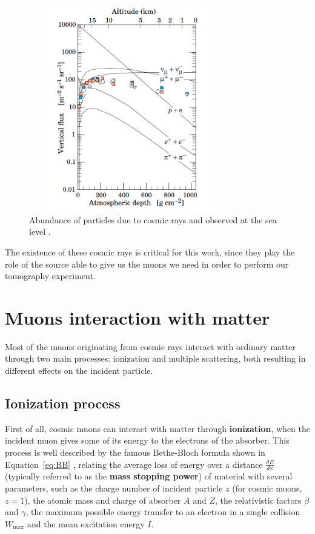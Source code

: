 \documentclass[a4paper, 11pt]{report}
\begin{document}
\begin{figure}[htbp]
\begin{center}
\includegraphics[width=8.5cm, height=9cm]{figs/cosmicMuons.png}
\caption{Abundance of particles due to cosmic rays and observed at the sea level \cite{cosmicPDG}.}
\label{figure:cosmicAbundance}
\end{center}
\end{figure}

The existence of these cosmic rays is critical for this work, since they play the role of the source able to give us the muons we need in order to perform our tomography experiment.

\section{Muons interaction with matter} \label{sec:interactions}

Most of the muons originating from cosmic rays interact with ordinary matter through two main processes: ionization and multiple scattering, both resulting in different effects on the incident particle.

\subsection{Ionization process}

First of all, cosmic muons can interact with matter through \textbf{ionization}, when the incident muon gives some of its energy to the electrons of the absorber. This process is well described by the famous Bethe-Bloch formula shown in Equation~\ref{eq:BB} \cite{PDGMuons}, relating the average loss of energy over a distance $\frac{dE}{dx}$ (typically referred to as the \textbf{mass stopping power}) of material with several parameters, such as the charge number of incident particle $z$ (for cosmic muons, $z = 1$), the atomic mass and charge of absorber $A$ and $Z$, the relativistic factors $\beta$ and $\gamma$, the maximum possible energy transfer to an electron in a single collision $W_{\text{max}}$ and the mean excitation energy $I$.
\end{document}
